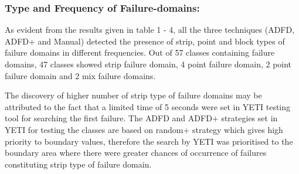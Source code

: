 \documentclass[runningheads,a4paper]{llncs}
\begin{document}




\subsubsection{Type and Frequency of Failure-domains:}
As evident from the results given in table 1 - 4, all the three techniques (ADFD, ADFD+ and Manual) detected the presence of strip, point and block types of failure domains in different frequencies. Out of 57 classes containing failure domains, 47 classes showed strip failure domain, 4 point failure domain, 2 point failure domain and 2 mix failure domains.  

The discovery of higher number of strip type of failure domains may be attributed to the fact that a limited time of 5 seconds were set in YETI testing tool for searching the first failure. The ADFD and ADFD+ strategies set in YETI for testing the classes are based on random+ strategy which gives high priority to boundary values, therefore the search by YETI was prioritised to the boundary area where there were greater chances of occurrence of failures constituting strip type of failure domain.

\end{document}
